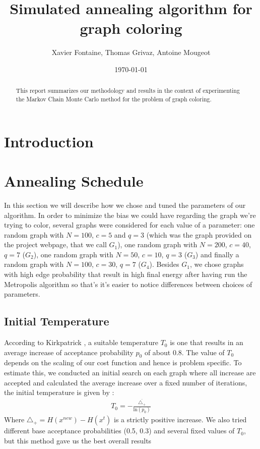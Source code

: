 \documentclass[a4paper]{article}
\title{Simulated annealing algorithm for graph coloring}
\author{Xavier Fontaine, Thomas Grivaz, Antoine Mougeot}
\date{\today}
\begin{document}
\maketitle

\begin{abstract}
This report summarizes our methodology and results in the context of experimenting the Markov Chain Monte Carlo method for the problem of graph coloring.
\end{abstract}

\section{Introduction}
\label{sec:introduction}

\section{Annealing Schedule}
In this section we will describe how we chose and tuned the parameters of our algorithm. In order to minimize the bias we could have regarding the graph we're trying to color, several graphs were considered for each value of a parameter: one random graph with $N=100$, $c=5$ and $q=3$ (which was the graph provided on the project webpage, that we call $G_1$), one random graph with $N=200$, $c=40$, $q=7$ ($G_2$), one random graph with $N=50$, $c=10$, $q=3$ ($G_3$) and finally a random graph with $N=100$, $c=30$, $q=7$ ($G_4$). Besides $G_1$, we chose graphs with high edge probability that result in high final energy after having run the Metropolis algorithm so that's it's easier to notice differences between choices of parameters.

\subsection{Initial Temperature}
According to Kirkpatrick \cite{kirkpatrick}, a suitable temperature $T_0$ is one that results in an average increase of acceptance probability $p_0$ of about 0.8. The value of $T_0$ depends on the scaling of our cost function and hence is problem specific. To estimate this, we conducted an initial search on each graph where all increase are accepted and calculated the average increase over a fixed number of iterations, the initial temperature is given by :
\begin{align*}
T_0 = -\frac{\overline{\triangle_+}}{\mathrm{ln}(p_0)}
\end{align*}
Where $\triangle_+ = H(x^{new}) - H(x^t)$ is a strictly positive increase. We also tried different base acceptance probabilities (0.5, 0.3) and several fixed values of $T_0$, but this method gave us the best overall results
\end{document}
